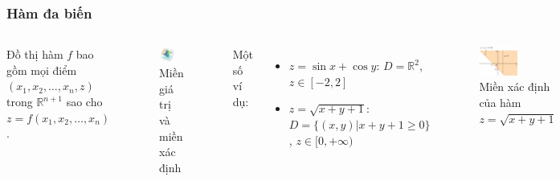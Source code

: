 \begin{frame}
\frametitle{Hàm đa biến}
\begin{columns}
Đồ thị hàm \(f\) bao gồm mọi điểm \((x_1, x_2, \ldots, x_n, z)\) trong \(\mathbb{R}^{n+1}\) sao cho \(z = f(x_1, x_2, \ldots, x_n)\).
\begin{figure}
    \centering
    \includegraphics[width=0.65\textwidth]{Content/Figure/Domains.png}
    \caption{Miền giá trị và miền xác định}
\end{figure}
Một số ví dụ:
\begin{itemize}
    \item \(z=\sin x + \cos y\): \(D = \mathbb{R}^2\), \(z \in [-2, 2]\)
    \item \(z=\sqrt{x+y+1}\): \(D = \{(x,y) | x+y+1 \geq 0\}\), \(z \in [0, +\infty)\)
\end{itemize}
\begin{figure}
\centering
\includegraphics[width=0.5\textwidth]{Content/Figure/MienXacDinh.png}
\caption{Miền xác định của hàm \(z=\sqrt{x+y+1}\)}
\end{figure}
\end{columns}
\end{frame}

